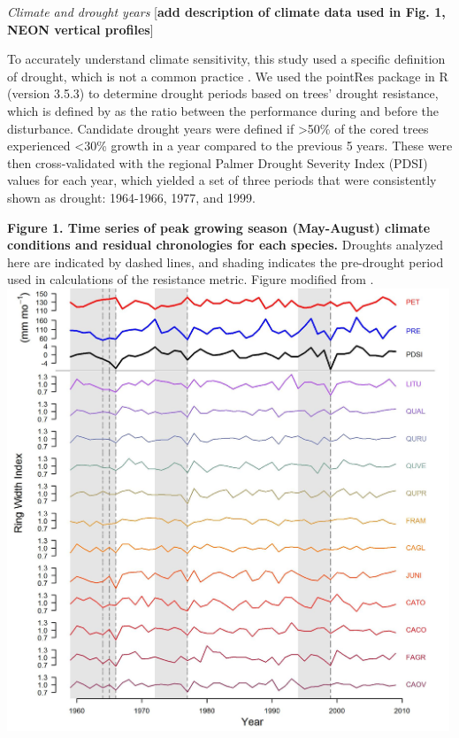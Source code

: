 \documentclass[]{article}
\begin{document}
\emph{Climate and drought years} {[}\textbf{add description of climate
data used in Fig. 1, NEON vertical profiles}{]}

To accurately understand climate sensitivity, this study used a specific
definition of drought, which is not a common practice
\citep{slette_how_2019}. We used the pointRes package \citep{R-pointRes}
in R (version 3.5.3) to determine drought periods based on trees'
drought resistance, which is defined by \citep{lloret_components_2011}
as the ratio between the performance during and before the disturbance.
Candidate drought years were defined if \textgreater50\% of the cored
trees experienced \textless30\% growth in a year compared to the
previous 5 years. These were then cross-validated with the regional
Palmer Drought Severity Index (PDSI) values for each year, which yielded
a set of three periods that were consistently shown as drought:
1964-1966, 1977, and 1999.

\textbf{Figure 1. Time series of peak growing season (May-August)
climate conditions and residual chronologies for each species.} Droughts
analyzed here are indicated by dashed lines, and shading indicates the
pre-drought period used in calculations of the resistance metric. Figure
modified from \citep{helcoski_growing_2019}.
\includegraphics[width=5.20833in,height=\textheight]{tables_figures/Time_series_for_each_species.jpg}
\end{document}
